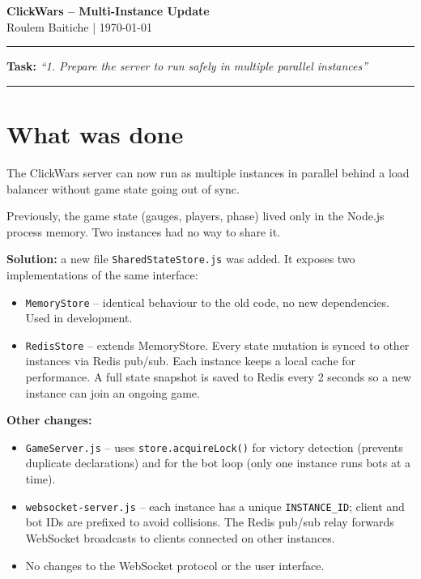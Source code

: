 \documentclass[12pt, a4paper]{article}
\begin{document}
\begin{center}
    {\Large \textbf{ClickWars -- Multi-Instance Update}}\\[0.4em]
    {\small Roulem Baitiche \quad | \quad \today}
\end{center}

\vspace{1em}
\hrule
\vspace{1.2em}

\textbf{Task:} \textit{``1. Prepare the server to run safely in multiple parallel instances''}

\vspace{0.5em}
\hrule
\vspace{1em}

\section*{What was done}

The ClickWars server can now run as multiple instances in parallel behind a load balancer without game state going out of sync.

Previously, the game state (gauges, players, phase) lived only in the Node.js process memory. Two instances had no way to share it.

\textbf{Solution:} a new file \texttt{SharedStateStore.js} was added. It exposes two implementations of the same interface:

\begin{itemize}
    \item \texttt{MemoryStore} -- identical behaviour to the old code, no new dependencies. Used in development.
    \item \texttt{RedisStore} -- extends MemoryStore. Every state mutation is synced to other instances via Redis pub/sub. Each instance keeps a local cache for performance. A full state snapshot is saved to Redis every 2 seconds so a new instance can join an ongoing game.
\end{itemize}

\textbf{Other changes:}
\begin{itemize}
    \item \texttt{GameServer.js} -- uses \texttt{store.acquireLock()} for victory detection (prevents duplicate declarations) and for the bot loop (only one instance runs bots at a time).
    \item \texttt{websocket-server.js} -- each instance has a unique \texttt{INSTANCE\_ID}; client and bot IDs are prefixed to avoid collisions. The Redis pub/sub relay forwards WebSocket broadcasts to clients connected on other instances.
    \item No changes to the WebSocket protocol or the user interface.
\end{itemize}
\end{document}
